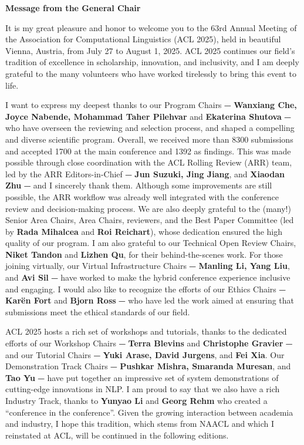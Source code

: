 \textbf{Message from the General Chair}

It is my great pleasure and honor to welcome you to the 63rd Annual Meeting of the Association for Computational Linguistics (ACL 2025), held in beautiful Vienna, Austria, from July 27 to August 1, 2025. ACL 2025 continues our field’s tradition of excellence in scholarship, innovation, and inclusivity, and I am deeply grateful to the many volunteers who have worked tirelessly to bring this event to life.

I want to express my deepest thanks to our Program Chairs ⏤ \textbf{Wanxiang Che, Joyce Nabende, Mohammad Taher Pilehvar} and \textbf{Ekaterina Shutova} ⏤ who have overseen the reviewing and selection process, and shaped a compelling and diverse scientific program. Overall, we received more than 8300 submissions and accepted 1700 at the main conference and 1392 as findings. This was made possible through close coordination with the ACL Rolling Review (ARR) team, led by the ARR Editors-in-Chief ⏤ \textbf{Jun Suzuki, Jing Jiang}, and \textbf{Xiaodan Zhu} ⏤ and I sincerely thank them. Although some improvements are still possible, the ARR workflow was already well integrated with the conference review and decision-making process. We are also deeply grateful to the (many!) Senior Area Chairs, Area Chairs, reviewers, and the Best Paper Committee (led by \textbf{Rada Mihalcea} and \textbf{Roi Reichart}), whose dedication ensured the high quality of our program. I am also grateful to our Technical Open Review Chairs, \textbf{Niket Tandon} and \textbf{Lizhen Qu}, for their behind-the-scenes work. For those joining virtually, our Virtual Infrastructure Chairs ⏤ \textbf{Manling Li, Yang Liu}, and \textbf{Avi Sil} ⏤ have worked to make the hybrid conference experience inclusive and engaging. I would also like to recognize the efforts of our Ethics Chairs ⏤ \textbf{Karën Fort} and \textbf{Bjorn Ross} ⏤ who have led the work aimed at ensuring that submissions meet the ethical standards of our field. 

ACL 2025 hosts a rich set of workshops and tutorials, thanks to the dedicated efforts of our Workshop Chairs ⏤ \textbf{Terra Blevins} and \textbf{Christophe Gravier} ⏤ and our Tutorial Chairs ⏤ \textbf{Yuki Arase, David Jurgens}, and \textbf{Fei Xia}. Our Demonstration Track Chairs ⏤ \textbf{Pushkar Mishra, Smaranda Muresan}, and \textbf{Tao Yu} ⏤ have put together an impressive set of system demonstrations of cutting-edge innovations in NLP. I am proud to say that we also have a rich Industry Track, thanks to \textbf{Yunyao Li} and \textbf{Georg Rehm} who created a “conference in the conference”. Given the growing interaction between academia and industry, I hope this tradition, which stems from NAACL and which I reinstated at ACL, will be continued in the following editions.

